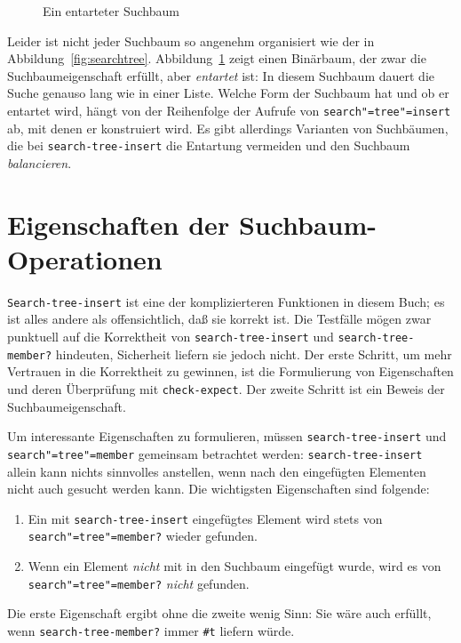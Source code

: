 \begin{figure}[tb]
  \begin{pspdf}
  \begin{center}
    \caption{Ein entarteter Suchbaum}
    \label{fig:stupid-searchtree}
  \end{center}
\end{pspdf}
\end{figure}

Leider ist nicht jeder Suchbaum so angenehm organisiert wie der in
Abbildung~\ref{fig:searchtree}.  Abbildung~\ref{fig:stupid-searchtree}
zeigt einen Binärbaum, der zwar die Suchbaumeigenschaft erfüllt, aber
\textit{entartet}
ist:\label{label:entartet}
In diesem Suchbaum dauert die Suche genauso
lang wie in einer Liste.  Welche Form der Suchbaum hat und ob er
entartet wird, hängt von der
Reihenfolge der Aufrufe von \texttt{search"=tree"=insert}
ab, mit denen er konstruiert wird.  Es gibt allerdings Varianten von Suchbäumen, die bei
  \texttt{search-tree-insert} die Entartung vermeiden und den
  Suchbaum \textit{balancieren}.


\section{Eigenschaften der Suchbaum-Operationen}

\texttt{Search-tree-insert} ist eine der komplizierteren Funktionen in
diesem Buch; es ist alles andere als offensichtlich, daß sie korrekt
ist.  Die Testfälle mögen zwar punktuell auf die Korrektheit von
\texttt{search-tree-insert} und \texttt{search-tree-member?}
hindeuten, Sicherheit liefern sie jedoch nicht.  Der erste Schritt, um
mehr Vertrauen in die Korrektheit zu gewinnen, ist die Formulierung
von Eigenschaften und deren Überprüfung mit \texttt{check-expect}.
Der zweite Schritt ist ein Beweis der Suchbaumeigenschaft.

Um interessante Eigenschaften zu formulieren, müssen
\texttt{search-tree-insert} und \texttt{search"=tree"=member} gemeinsam
betrachtet werden: \texttt{search-tree-insert} allein kann nichts
sinnvolles anstellen, wenn nach den eingefügten Elementen nicht auch
gesucht werden kann.  Die wichtigsten Eigenschaften sind folgende:
%
\begin{enumerate}
\item Ein mit \texttt{search-tree-insert} eingefügtes Element wird
  stets von \texttt{search"=tree"=member?} wieder gefunden.
\item Wenn ein Element \emph{nicht} mit in den Suchbaum eingefügt
  wurde, wird es von \texttt{search"=tree"=member?} \emph{nicht}
  gefunden.
\end{enumerate}
%
Die erste Eigenschaft ergibt ohne die zweite wenig Sinn: Sie wäre auch
erfüllt, wenn \texttt{search-tree-member?} immer \verb|#t| liefern
würde.

